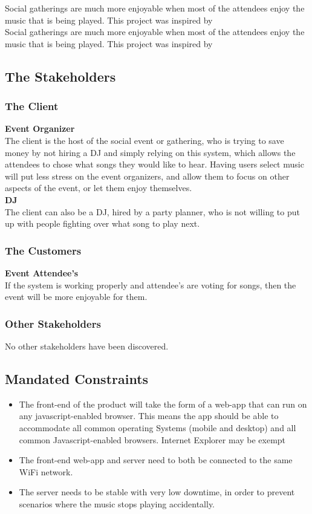 \documentclass[12pt, titlepage]{article}
\begin{document}
Social gatherings are much more enjoyable when most of the attendees enjoy
the music that is being played. This project was inspired by \\

Social gatherings are much more enjoyable when most of the attendees enjoy
the music that is being played. This project was inspired by

\subsection{The Stakeholders}

\subsubsection{The Client}

\textbf{Event Organizer}\\
The client is the host of the social event or gathering, who is trying to save
money by not hiring a DJ and simply relying on this system, which allows the
attendees to chose what songs they would like to hear. Having users select music
will put less stress on the event organizers, and allow them to focus on other
aspects of the event, or let them enjoy themselves. \\ \textbf{DJ} \\ The client can also be a DJ, hired by a party planner, who is not willing to put up with people fighting over what song to play next.

\subsubsection{The Customers}

\textbf{Event Attendee's}\\
If the system is working properly and attendee's are voting for songs, then
the event will be more enjoyable for them.
\subsubsection{Other Stakeholders}


No other stakeholders have been discovered.

\subsection{Mandated Constraints}

\begin{itemize}
\item The front-end of the product will take the form of a web-app that can
run on any javascript-enabled browser. This means the app should be able to
accommodate all common operating Systems (mobile and desktop) and all
common Javascript-enabled browsers. Internet Explorer may be exempt
\item The front-end web-app and server need to both be connected to the same
WiFi network.
\item The server needs to be stable with very low downtime, in order to prevent
scenarios where the music stops playing accidentally.
\end{itemize}
\end{document}

